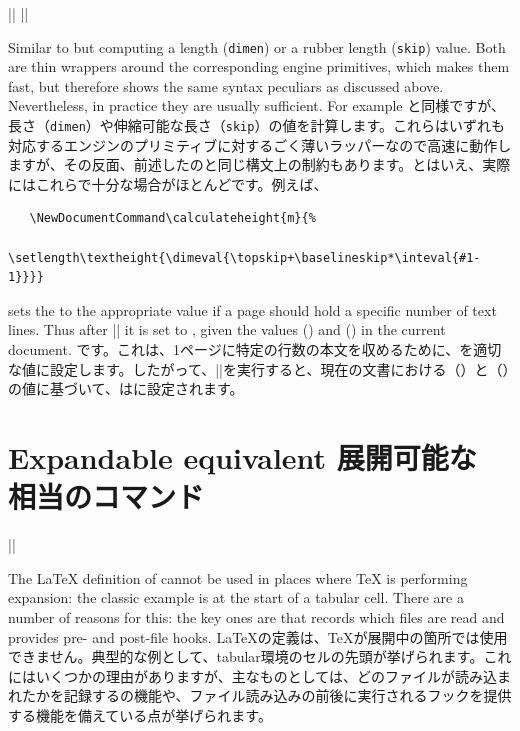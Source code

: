 \documentclass{ltxguide}
\newcommand\jpnewline{\vspace{3pt}\newline}
\begin{document}
\begin{decl}
  |\dimeval|  \qquad
  |\skipeval| 
\end{decl}

Similar to  but computing a length (\texttt{dimen}) or a
rubber length (\texttt{skip}) value. Both are thin wrappers around
the corresponding engine primitives, which makes them fast, but
therefore shows the same syntax peculiars as discussed
above. Nevertheless, in practice they are usually sufficient.  For
example
\jpnewline
{}と同様ですが、長さ（\texttt{dimen}）や伸縮可能な長さ（\texttt{skip}）の値を計算します。これらはいずれも対応するエンジンのプリミティブに対するごく薄いラッパーなので高速に動作しますが、その反面、前述したのと同じ構文上の制約もあります。とはいえ、実際にはこれらで十分な場合がほとんどです。例えば、
\begin{verbatim}
   \NewDocumentCommand\calculateheight{m}{%
     \setlength\textheight{\dimeval{\topskip+\baselineskip*\inteval{#1-1}}}}
\end{verbatim}
sets the  to the appropriate value if a page should
hold a specific number of text lines. Thus after ||
it is set to , given
the values  (\dimeval{\topskip}) and 
(\dimeval{\baselineskip}) in the current document.
です。これは、1ページに特定の行数の本文を収めるために、を適切な値に設定します。したがって、||を実行すると、現在の文書における（\dimeval{\topskip}）と（\dimeval{\baselineskip}）の値に基づいて、はに設定されます。

\section{Expandable  equivalent
展開可能な 相当のコマンド}

\begin{decl}
  |\expandableinput| 
\end{decl}
The \LaTeX{} definition of  cannot be used in places where \TeX{} is
performing expansion: the classic example is at the start of a tabular cell.
There are a number of reasons for this: the key ones are that 
records which files are read and provides pre- and post-file hooks.
\jpnewline
\LaTeX{}の定義は、\TeX{}が展開中の箇所では使用できません。典型的な例として、tabular環境のセルの先頭が挙げられます。これにはいくつかの理由がありますが、主なものとしては、どのファイルが読み込まれたかを記録するの機能や、ファイル読み込みの前後に実行されるフックを提供する機能を備えている点が挙げられます。
\end{document}
